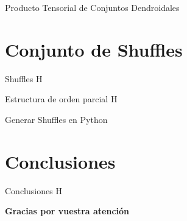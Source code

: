 \documentclass[12pt,aspectratio=169]{beamer}
\numberwithin{equation}{section}
\theoremstyle{definition}
\begin{document}
\begin{frame}{Producto Tensorial de Conjuntos Dendroidales}

\end{frame}

\section{Conjunto de Shuffles}

\begin{frame}{Shuffles}
    H
\end{frame}

\begin{frame}{Estructura de orden parcial}
    H
\end{frame}

\begin{frame}{Generar Shuffles en Python}

\end{frame}
\section{Conclusiones}

\begin{frame}{Conclusiones}
    H
\end{frame}


\begin{frame}
    \Huge{\centerline{\textbf{Gracias por vuestra atenci\'on}}}
\end{frame}

\end{document}
